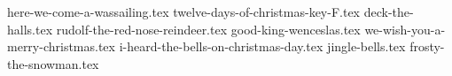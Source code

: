 \documentclass[letterpaper]{article}
\begin{document}

\begin{songs}{}

{here-we-come-a-wassailing.tex}
{twelve-days-of-christmas-key-F.tex}
{deck-the-halls.tex}
{rudolf-the-red-nose-reindeer.tex}
{good-king-wenceslas.tex}
{we-wish-you-a-merry-christmas.tex}
{i-heard-the-bells-on-christmas-day.tex}
{jingle-bells.tex}
{frosty-the-snowman.tex}

\begin{comment}
\end{comment}

\end{songs}
\end{document}
